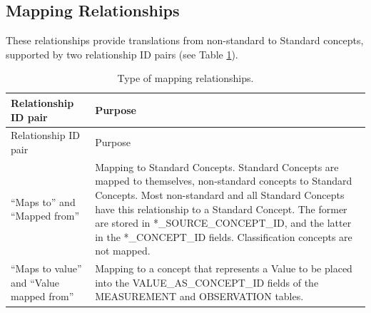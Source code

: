 \documentclass[11pt]{book}
\theoremstyle{definition}
\theoremstyle{definition}
\theoremstyle{definition}
\theoremstyle{remark}
\begin{document}
\subsection{Mapping Relationships}\label{conceptMapping}

These relationships provide translations from non-standard to Standard
concepts, supported by two relationship ID pairs (see Table
\ref{tab:mappingRelationships}). 

\begin{longtable}[]{@{}ll@{}}
\caption{\label{tab:mappingRelationships} Type of mapping
relationships.}\tabularnewline
\toprule
\begin{minipage}[b]{0.20\columnwidth}\raggedright\strut
Relationship ID pair\strut
\end{minipage} & \begin{minipage}[b]{0.71\columnwidth}\raggedright\strut
Purpose\strut
\end{minipage}\tabularnewline
\midrule
\endfirsthead
\toprule
\begin{minipage}[b]{0.20\columnwidth}\raggedright\strut
Relationship ID pair\strut
\end{minipage} & \begin{minipage}[b]{0.71\columnwidth}\raggedright\strut
Purpose\strut
\end{minipage}\tabularnewline
\midrule
\endhead
\begin{minipage}[t]{0.20\columnwidth}\raggedright\strut
``Maps to'' and ``Mapped from''\strut
\end{minipage} & \begin{minipage}[t]{0.71\columnwidth}\raggedright\strut
Mapping to Standard Concepts. Standard Concepts are mapped to
themselves, non-standard concepts to Standard Concepts. Most
non-standard and all Standard Concepts have this relationship to a
Standard Concept. The former are stored in *\_SOURCE\_CONCEPT\_ID, and
the latter in the *\_CONCEPT\_ID fields. Classification concepts are not
mapped.\strut
\end{minipage}\tabularnewline
\begin{minipage}[t]{0.20\columnwidth}\raggedright\strut
``Maps to value'' and ``Value mapped from''\strut
\end{minipage} & \begin{minipage}[t]{0.71\columnwidth}\raggedright\strut
Mapping to a concept that represents a Value to be placed into the
VALUE\_AS\_CONCEPT\_ID fields of the MEASUREMENT and OBSERVATION
tables.\strut
\end{minipage}\tabularnewline
\bottomrule
\end{longtable}
\end{document}
